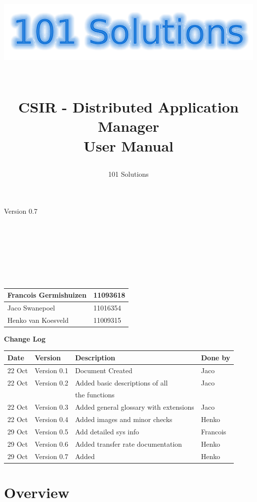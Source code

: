 \documentclass[a4paper,12pt,final]{article}
\title{
\begin{center}
  	\includegraphics[scale=0.3]{101Logo.png} 
  \end{center}
  \textbf{\\}
CSIR - Distributed Application Manager\\
User Manual\\
}
\author{101 Solutions}
\begin{document}
\maketitle
\begin{center}
Version 0.7
\end{center}
\textbf{\\}
\textbf{\\}
\textbf{\\}
\textbf{\\}
\textbf{\\}
\textbf{\\}
\begin{center}
\begin{tabular}{|l|l|}
\hline
Francois Germishuizen & 11093618\\
\hline
Jaco Swanepoel & 11016354\\
\hline
Henko van Koesveld & 11009315\\
\hline
\end{tabular}
\end{center}
\thispagestyle{empty}
\newpage
\thispagestyle{empty}
\textbf{\large{Change Log}}
\vspace{6pt}\newline
\begin{tabular}{|l|l|l|l|}
\hline
\textbf{Date} & \textbf{Version} & \textbf{Description} & \textbf{Done by}\\
\hline
22 Oct & Version 0.1 & Document Created & Jaco\\
\hline
22 Oct & Version 0.2 & Added basic descriptions of all  & Jaco\\
&&the functions&\\
\hline
22 Oct & Version 0.3 & Added general glossary with extensions & Jaco\\
\hline
22 Oct & Version 0.4 & Added images and minor checks  & Henko\\
\hline
29 Oct & Version 0.5 & Add detailed sys info  & Francois\\
\hline
29 Oct & Version 0.6 & Added transfer rate documentation & Henko\\
\hline
29 Oct & Version 0.7 & Added  & Henko\\
\hline
\end{tabular}
\newpage
\tableofcontents
\thispagestyle{empty}
\newpage

\section{Overview}
\end{document}
